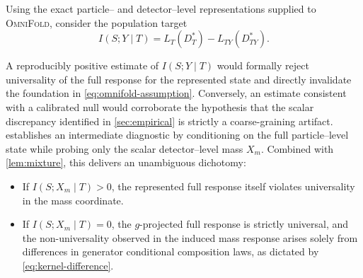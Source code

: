 \documentclass[12pt]{article}
\newcommand{\Gens}{\mathcal{S}}
\newcommand{\1}{\mathbbm{1}}
\renewcommand{\[}{\begin{equation}}
\renewcommand{\]}{\end{equation}}
\begin{document}
    Using the exact particle-- and detector--level representations supplied to \textsc{OmniFold}, consider the population target
    \begin{equation}
    \label{eq:full-test}
        I(S; Y \mid T) = L_T(D_T^*) - L_{TY}(D_{TY}^*).
    \end{equation}

\begin{corollary}
    \label{cor:full-test}
        \leavevmode
    \end{corollary}

    A reproducibly positive estimate of \(I(S; Y \mid T)\) would formally reject universality of the full response for the represented state and directly invalidate the foundation in \cref{eq:omnifold-assumption}.
    Conversely, an estimate consistent with a calibrated null would corroborate the hypothesis that the scalar discrepancy identified in \cref{sec:empirical} is strictly a coarse-graining artifact.
     establishes an intermediate diagnostic by conditioning on the full particle--level state while probing only the scalar detector--level mass \(X_m\).
    Combined with \cref{lem:mixture}, this delivers an unambiguous dichotomy:
    \begin{itemize}
        \item If \(I(S; X_m \mid T) > 0\), the represented full response itself violates universality in the mass coordinate.
        \item If \(I(S; X_m \mid T) = 0\), the \(g\)-projected full response is strictly universal, and the non-universality observed in the induced mass response arises solely from differences in generator conditional composition laws, as dictated by \cref{eq:kernel-difference}.
    \end{itemize}
\end{document}
